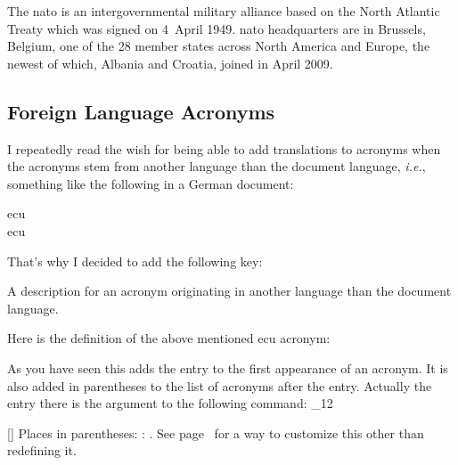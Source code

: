 \documentclass[load-preamble+,scrartcl={DIV10}]{cnltx-doc}
\makeatletter
\newcommand*\latin{\textit}
\renewenvironment{commands}
  {%
    \cnltx@set@catcode_{12}%
    \let\command\cnltx@command
    \cnltxlist
  }
  {\endcnltxlist}
\makeatother
\begin{document}
\begin{example}
  The \ac{nato} is an intergovernmental military alliance based on the
  North Atlantic Treaty which was signed on 4~April 1949. \ac{nato}
  headquarters are in Brussels, Belgium, one of the 28 member states
  across North America and Europe, the newest of which, Albania and
  Croatia, joined in April 2009.
\end{example}

\subsection{Foreign Language Acronyms}\label{ssec:foreign}
\noindent{}I repeatedly read the wish for being able to add
translations to acronyms when the acronyms stem from another language than the
document language, \latin{i.e.}, something like the following in a German 
document:
\begin{example}
  \ac{ecu}\\
  \ac{ecu}
\end{example}
That's why I decided to add the following key:
\begin{options}
    A description for an acronym originating in another language than the
    document language.
\end{options}

Here is the definition of the above mentioned \ac{ecu} acronym:
\begin{sourcecode}
\end{sourcecode}
As you have seen this adds the  entry to the first appearance
of an acronym.  It is also added in parentheses to the list of acronyms after
the  entry.  Actually the entry there is the argument to the
following command:
\begin{commands}
  \command{acroenparen}[]
    Places  in parentheses: :
    .  See page~\pageref{key:list-foreign-format} for a
    way to customize this other than redefining it.
\end{commands}
\end{document}
